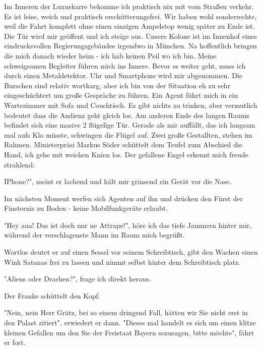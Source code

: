 \documentclass[20pt]{extarticle}
\begin{document}
Im Inneren der Luxuskarre bekomme ich praktisch nix mit vom Straßen
verkehr. Es ist leise, weich und praktisch erschütterungsfrei. Wir
haben wohl sonderrechte, weil die Fahrt komplett ohne einen einzigen
Ampelstop wenig später zu Ende ist. Die Tür wird mir geöffent und
ich steige aus. Unsere Kolone ist im Innenhof eines eindrucksvollen
Regierungsgebäudes irgendwo in München. Na hoffentlich bringen die
mich danach wieder heim - ich hab keinen Peil wo ich bin. Meine
schweigsamen Begleiter führen mich ins Innere. Bevor es weiter geht,
muss ich durch einen Metaldetektor. Uhr und Smartphone wird mir
abgenommen. Die Burschen sind relativ wortkarg, aber ich bin von der
Situation eh zu sehr eingeschüchtert um große Gespräche zu
führen. Ein Agent führt mich in ein Wartezimmer mit Sofa und
Couchtisch. Es gibt nichts zu trinken, aber vermutlich bedeutet dass
die Audienz geht gleich los. Am anderen Ende des langen Raums
befindet sich eine masive 2 flügelige Tür. Gerade als mir auffällt,
das ich langsam mal aufs Klo müsste, schwingen die Flügel auf. Zwei
große Gestallten, stehen im Rahmen. Ministerpräsi Markus Söder
schüttelt dem Teufel zum Abschied die Hand, ich gehe mit weichen
Knien los. Der gefallene Engel erkennt mich freude strahlend:

\begin{center}
\grqq IPhone?", meint er lachend und hält mir grinsend ein Gerät vor die
Nase.
\end{center}

Im nächsten Moment werfen sich Agenten auf ihn und drücken den Fürst
der Finsternis zu Boden - keine Mobilfunkgeräte erlaubt.

\begin{center}
"Hey aua! Das ist doch nur ne Attrape!", höre ich das tiefe Jammern
hinter mir, während der verschlagenste Mann im Raum mich begrüßt.
\end{center}

Wortlos deutet er auf einen Sessel vor seinem Schreibtisch, gibt den
Wachen einen Wink Satanas frei zu lassen und nimmt selbst hinter dem
Schreibtisch platz.

\begin{center}
"Aliens oder Drachen?", frage ich direkt heraus. 
\end{center}

Der Franke schüttelt den Kopf.

\begin{center}
"Nein, nein Herr Grätz, bei so einem dringend Fall, hätten wir Sie
nicht erst in den Palast zitiert", erwiedert er dann. "Dieses mal
handelt es sich um einen klitze kleinen Gefallen um den Sie der
Freistaat Bayern sozusagen, bitte möchte", fährt er fort.
\end{center}
\end{document}
